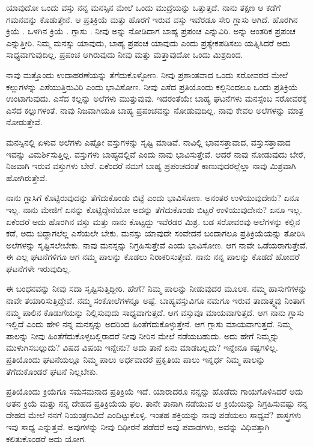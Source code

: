 ಯಾವುದೋ ಒಂದು ವಸ್ತು ನನ್ನ ಮನಸ್ಸಿನ ಮೇಲೆ ಒಂದು ಮುದ್ರೆಯನ್ನು ಒತ್ತುತ್ತದೆ. ನಾನು ತಕ್ಷಣ ಆ ಕಡೆಗೆ ಗಮನವನ್ನು ಕೊಡುತ್ತೇನೆ. ಆ ಪ್ರತಿಕ್ರಿಯೆ ಮತ್ತು ಹೊರಗೆ ಇರುವ ವಸ್ತು ಇವೆರಡೂ ಸೇರಿ ಗ್ಲಾಸು ಆಗಿದೆ. ಹೊರಗಿನ ಕ್ರಿಯೆ . ಒಳಗಿನ ಕ್ರಿಯೆ . ಗ್ಲಾಸು . ನೀವು  ಅನ್ನು ನೋಡಿದಾಗ ಬಾಹ್ಯ ಪ್ರಪಂಚ ಎನ್ನುವಿರಿ.  ಅನ್ನು ಆಂತರಿಕ ಪ್ರಪಂಚ ಎನ್ನುತ್ತೀರಿ. ನಿಮ್ಮ ಮನಸ್ಸು ಯಾವುದು, ಬಾಹ್ಯ ಪ್ರಪಂಚ ಯಾವುದು ಎಂದು ಪ್ರತ್ಯೇಕಪಡಿಸಲು ಯತ್ನಿಸಿದರೆ ಅದು ಸಾಧ್ಯವಾಗುವುದಿಲ್ಲ. ಪ್ರಪಂಚ ಆಗಿರುವುದು ನೀವು ಮತ್ತು ಮತ್ತಾವುದೋ ಒಂದು ಮಿಶ್ರದಿಂದ.

ನಾವು ಮತ್ತೊಂದು ಉದಾಹರಣೆಯನ್ನು ತೆಗೆದುಕೊಳ್ಳೋಣ. ನೀವು ಪ್ರಶಾಂತವಾದ ಒಂದು ಸರೋವರದ ಮೇಲೆ ಕಲ್ಲುಗಳನ್ನು ಎಸೆಯುತ್ತಿರುವಿರಿ ಎಂದು ಭಾವಿಸೋಣ. ನೀವು ಎಸೆದ ಪ್ರತಿಯೊಂದು ಕಲ್ಲಿನಿಂದಲೂ ಒಂದು ಪ್ರತಿಕ್ರಿಯೆ ಉಂಟಾಗುವುದು. ಎಸೆದ ಕಲ್ಲನ್ನು ಅಲೆಗಳು ಮುತ್ತುವುವು. ಇದರಂತೆಯೇ ಬಾಹ್ಯ ಘಟನೆಗಳು ಮನಸ್ಸೆಂಬ ಸರೋವರಕ್ಕೆ ಎಸೆದ ಕಲ್ಲುಗಳಂತೆ. ನಾವು ನಿಜವಾಗಿಯೂ ಬಾಹ್ಯ ಪ್ರಪಂಚವನ್ನು ನೋಡುವುದಿಲ್ಲ. ನಾವು ಕೇವಲ ಅಲೆಗಳನ್ನು ಮಾತ್ರ ನೋಡುತ್ತೇವೆ.

ಮನಸ್ಸಿನಲ್ಲಿ ಏಳುವ ಅಲೆಗಳು ಎಷ್ಟೋ ವಸ್ತುಗಳನ್ನು ಸೃಷ್ಟಿ ಮಾಡಿವೆ. ನಾವಿಲ್ಲಿ ಭಾವಸತ್ತಾವಾದ, ವಸ್ತುಸತ್ತಾವಾದ ಇವನ್ನು ವಿಮರ್ಶಿಸುತ್ತಿಲ್ಲ. ವಸ್ತುಗಳು ಬಾಹ್ಯದಲ್ಲಿವೆ ಎಂದು ನಾವು ಭಾವಿಸುತ್ತೇವೆ. ಆದರೆ ನಾವು ನೋಡುವುದು ಬೇರೆ, ನಿಜವಾಗಿ ಇರುವ ವಸ್ತುಗಳು ಬೇರೆ. ಏಕೆಂದರೆ ನಮಗೆ ಬಾಹ್ಯ ಪ್ರಪಂಚದಂತೆ ಕಾಣುವುದರಲ್ಲೆಲ್ಲಾ ನಾವು ಮಿಶ್ರವಾಗಿ ಹೋಗಿರುತ್ತೇವೆ.

ನಾನು ಗ್ಲಾಸಿಗೆ ಕೊಟ್ಟಿರುವುದನ್ನು ತೆಗೆದುಕೊಂಡು ಬಿಟ್ಟೆ ಎಂದು ಭಾವಿಸೋಣ. ಅನಂತರ ಉಳಿಯುವುದೇನು? ಏನೂ ಇಲ್ಲ. ನಾನು ಮೇಜಿಗೆ ಏನನ್ನು ಕೊಟ್ಟಿದ್ದೇನೆಯೋ ಅದನ್ನು ತೆಗೆದುಕೊಂಡು ಬಿಟ್ಟರೆ ಉಳಿಯುವುದೇನು? ಏನೂ ಇಲ್ಲ. ಏಕೆಂದರೆ ಅದು ಹೊರಗಿನ ವಸ್ತು ಮತ್ತು ನಾನು ಕೊಟ್ಟದ್ದು ಇವೆರಡರ ಮಿಶ್ರ. ಬಡ ಸರೋವರವು ಅಲೆಗಳನ್ನು ಕಲ್ಲಿನ ಕಡೆ, ಅದು ಬಿದ್ದಾಗಲೆಲ್ಲ ಎಸೆಯಲೇ ಬೇಕು. ಮನಸ್ಸು ಯಾವುದೇ ಸಂವೇದನೆ ಬಂದಾಗಲೂ ಪ್ರತಿಕ್ರಿಯೆಯನ್ನು ತೋರಿಸಿ ಅಲೆಗಳನ್ನು ಸೃಷ್ಟಿಸಲೇಬೇಕು. ನಾವು ಮನಸ್ಸನ್ನು ನಿಗ್ರಹಿಸುತ್ತೇವೆ ಎಂದು ಭಾವಿಸೋಣ. ಆಗ ನಾವೇ ಒಡೆಯರಾಗುತ್ತೇವೆ. ಈ ಎಲ್ಲ ಘಟನೆಗಳಿಗೂ ಆಗ ನಮ್ಮ ಪಾಲನ್ನು ಕೊಡಲು ನಿರಾಕರಿಸುತ್ತೇವೆ. ನಾನು ನನ್ನ ಪಾಲನ್ನು ಕೊಡದೆ ಹೋದರೆ ಘಟನೆಗಳೇ ಇರುವುದಿಲ್ಲ.

ಈ ಬಂಧನವನ್ನು ನೀವು ಸದಾ ಸೃಷ್ಟಿಸುತ್ತಿದ್ದೀರಿ. ಹೇಗೆ? ನಿಮ್ಮ ಪಾಲನ್ನು ನೀಡುವುದರ ಮೂಲಕ. ನಮ್ಮ ಹಾಸುಗೆಗಳನ್ನು ನಾವೇ ತಯಾರಿಸುತ್ತಿದ್ದೇವೆ. ನಮ್ಮ ಸಂಕೋಲೆಗಳನ್ನೂ ಅಷ್ಟೆ. ಬಾಹ್ಯವಸ್ತುವಿಗೂ ನಮಗೂ ಇರುವ ತಾದಾತ್ಮ್ಯವು ನಿಂತಾಗ ನಮ್ಮ ಪಾಲಿನ ಕೊಡುಗೆಯನ್ನು ನಿಲ್ಲಿಸುವುದು ಸಾಧ್ಯವಾಗುತ್ತದೆ. ಆಗ ವಸ್ತುವೂ ಮಾಯವಾಗುತ್ತದೆ. ಆಗ ನಾನು ಗ್ಲಾಸು ಇಲ್ಲಿದೆ ಎಂದು ಹೇಳಿ ನನ್ನ ಮನಸ್ಸನ್ನು ಅದರಿಂದ ಹಿಂತೆಗೆದುಕೊಳ್ಳುತ್ತೇನೆ. ಆಗ ಗ್ಲಾಸು ಮಾಯವಾಗುತ್ತದೆ. ನಿಮ್ಮ ಪಾಲನ್ನು ನೀವು ಹಿಂತೆಗೆದುಕೊಳ್ಳಬಲ್ಲಿರಾದರೆ ನೀವು ನೀರಿನ ಮೇಲೆ ನಡೆಯಬಹುದು. ಅದು ಹೇಗೆ ನಿಮ್ಮನ್ನು ಮುಳುಗಿಸಬಲ್ಲುದು? ವಿಷದ ವಿಷಯ ಇನ್ನೇನು? ಅದು ತಾನೆ ಏನು ಮಾಡಬಲ್ಲದು? ಇನ್ನೇನೂ ಕಷ್ಟಗಳಿಲ್ಲ. ಪ್ರತಿಯೊಂದು ಘಟನೆಯಲ್ಲೂ ನಿಮ್ಮ ಪಾಲು ಅರ್ಧವಾದರೆ ಪ್ರಕೃತಿಯ ಪಾಲು ಇನ್ನರ್ಧ ನಿಮ್ಮ ಪಾಲನ್ನು ತೆಗೆದುಕೊಂಡರೆ ಘಟನೆ ನಿಲ್ಲಬೇಕು.

ಪ್ರತಿಯೊಂದು ಕ್ರಿಯೆಗೂ ಸಮಸಮನಾದ ಪ್ರತಿಕ್ರಿಯೆ ಇದೆ. ಯಾರಾದರೂ ನನ್ನನ್ನು ಹೊಡೆದು ಗಾಯಗೊಳಿಸಿದರೆ ಅದು ಆತನ ಕ್ರಿಯೆ ಮತ್ತು ನನ್ನ ದೇಹದ ಪ್ರತಿಕ್ರಿಯೆಯ ಫಲ. ತಾನೇ ತಾನಾಗಿ ನಡೆಯುವ ಆ ಕ್ರಿಯೆಯನ್ನು ನಿಗ್ರಹಿಸುವಷ್ಟು ನನ್ನ ದೇಹದ ಮೇಲೆ ನನಗೆ ನಿಯಂತ್ರಣವಿದೆ ಎಂದಿಟ್ಟುಕೊಳ್ಳಿ. ಇಂತಹ ಶಕ್ತಿಯನ್ನು ನಾವು ಪಡೆಯಲು ಸಾಧ್ಯವೆ? ಶಾಸ್ತ್ರಗಳು ಇವು ಸಾಧ್ಯ ಎನ್ನುತ್ತವೆ. ಅವುಗಳನ್ನು ನೀವು ದಿಢೀರನೆ ಪಡೆದರೆ ಅವು ಪವಾಡಗಳು, ಅವನ್ನು ವಿಧಿವತ್ತಾಗಿ ಕಲಿತುಕೊಂಡರೆ ಅದು ಯೋಗ.

